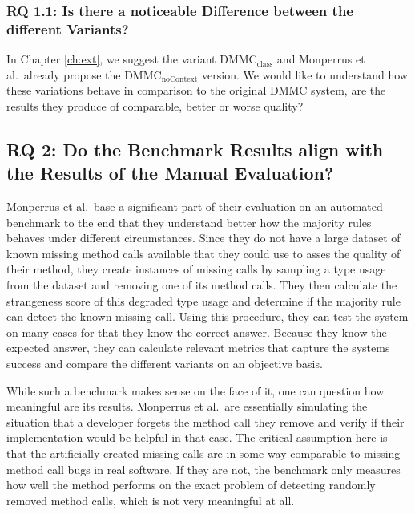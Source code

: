 \subsubsection{RQ 1.1: Is there a noticeable Difference between the different Variants?}

In Chapter \ref{ch:ext}, we suggest the variant $\text{DMMC}_\text{class}$ and Monperrus et al.\ already propose the $\text{DMMC}_\text{noContext}$ version.
We would like to understand how these variations behave in comparison to the original $\text{DMMC}$ system, are the results they produce of comparable, better or worse quality?

\subsection{RQ 2: Do the Benchmark Results align with the Results of the Manual Evaluation?}

Monperrus et al.\ base a significant part of their evaluation on an automated benchmark to the end that they understand better how the majority rules behaves under different circumstances.
Since they do not have a large dataset of known missing method calls available that they could use to asses the quality of their method, they create instances of missing calls by sampling a type usage from the dataset and removing one of its method calls.
They then calculate the strangeness score of this degraded type usage and determine if the majority rule can detect the known missing call.
Using this procedure, they can test the system on many cases for that they know the correct answer.
Because they know the expected answer, they can calculate relevant metrics that capture the systems success and compare the different variants on an objective basis.

While such a benchmark makes sense on the face of it, one can question how meaningful are its results.
Monperrus et al.\ are essentially simulating the situation that a developer forgets the method call they remove and verify if their implementation would be helpful in that case.
The critical assumption here is that the artificially created missing calls are in some way comparable to missing method call bugs in real software.
If they are not, the benchmark only measures how well the method performs on the exact problem of detecting randomly removed method calls, which is not very meaningful at all.

